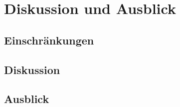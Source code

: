 \chapter{Diskussion und Ausblick}
\section{Einschränkungen}
\section{Diskussion}
\section{Ausblick}
